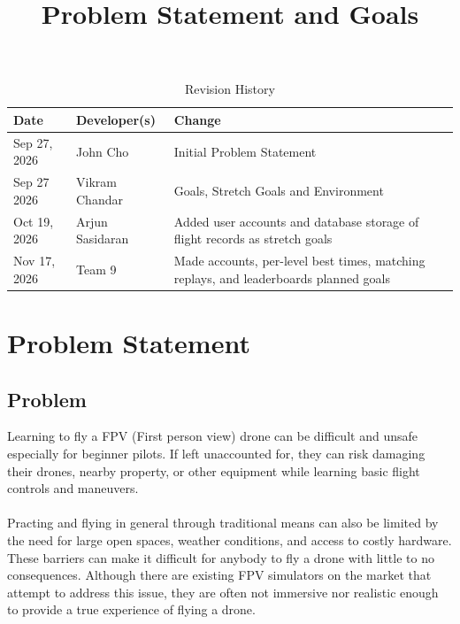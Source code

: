 \documentclass{article}
\title{Problem Statement and Goals\\\progname}
\author{\authname}
\date{}
\begin{document}
\maketitle

\begin{table}[hp]
\caption{Revision History} \label{TblRevisionHistory}
\begin{tabularx}{\textwidth}{llX}
\toprule
\textbf{Date} & \textbf{Developer(s)} & \textbf{Change}\\
\midrule
Sep 27, 2026 & John Cho & Initial Problem Statement\\
Sep 27 2026 & Vikram Chandar & Goals, Stretch Goals and Environment\\
Oct 19, 2026 & Arjun Sasidaran & Added user accounts and database storage of flight records as stretch goals\\
Nov 17, 2026 & Team 9 & Made accounts, per-level best times, matching replays, and leaderboards planned goals\\
\bottomrule
\end{tabularx}
\end{table}

\newpage

\section{Problem Statement}



\subsection{Problem}

Learning to fly a FPV (First person view) drone can be difficult and unsafe especially 
for beginner pilots. If left unaccounted for, they can risk damaging their drones, nearby 
property, or other equipment while learning basic flight controls and maneuvers.
\\ \\
Practing and flying in general through traditional means can also be limited by the need 
for large open spaces, weather conditions, and access to costly hardware. 
These barriers can make it difficult for anybody to fly a drone with little to no
consequences. Although there are existing FPV simulators on the market that attempt to address this issue, 
they are often not immersive nor realistic enough to provide a true experience of flying a drone. 
\end{document}
